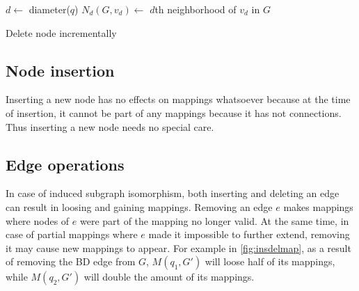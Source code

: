 \begin{algorithm}[htp]
    \SetAlgoLined\DontPrintSemicolon
    \nl $d \gets $ diameter($q$)\;
    \nl $N_d(G, v_d) \gets$ $d$th neighborhood of $v_d$ in $G$\;
    \caption{Delete node incrementally}
\end{algorithm}

\subsection{Node insertion}

Inserting a new node has no effects on mappings whatsoever because at the time of insertion,
it cannot be part of any mappings because it has not connections. Thus inserting a new node
needs no special care.

\subsection{Edge operations}

In case of induced subgraph isomorphism, both inserting and deleting an edge can result 
in loosing and gaining mappings. Removing an edge $e$ makes mappings where nodes of $e$
were part of the mapping no longer valid. At the same time, in case of partial mappings
where $e$ made it impossible to further extend, removing it may cause new mappings to
appear. For example in \ref{fig:insdelmap}, as a result of removing the BD edge from $G$,
$M(q_1, G')$ will loose half of its mappings, while $M(q_2, G')$ will double the amount of
its mappings. 

